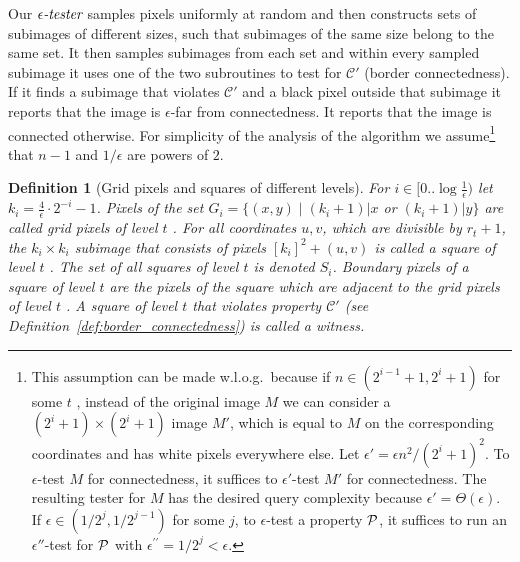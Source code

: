 \documentclass[11pt,english]{article}
\newtheorem{definition}{Definition}[section]
\numberwithin{figure}{section}
\newcommand{\C}{{\mathcal C}}
\newcommand{\eps}{{\epsilon}}
\newcommand{\ste}{{\epsilon\emph{-tester}}}
\newcommand{\integerset}[1]{[0..{#1})}
\newcommand{\lind}{t}
\begin{document}
Our $\ste$ samples pixels uniformly at random and
then constructs sets of subimages of different sizes, such that subimages of the
same size belong to the same set.
It then samples subimages from each set and within every sampled subimage
it uses one of the two subroutines to test for $\C'$ (border
connectedness). If it finds a subimage that violates $\C'$ and a black
pixel outside that subimage it reports that the image is $\eps$-far from
connectedness. It reports that the image is connected otherwise. For simplicity
of the analysis of the algorithm we assume\footnote {This assumption can be made
w.l.o.g.\ because if $n\in(2^{i-1}+1,2^{i}+1)$ for some $\lind$ , instead of the original image $M$ we can consider a $(2^{i}+1)\times (2^{i}+1)$ image $M'$, which is equal to $M$ on the corresponding coordinates and has white pixels everywhere else. Let
$\eps'=\eps n^{2}/(2^{i}+1)^{2}$.
To $\eps$-test $M$ for connectedness, it suffices to $\eps'$-test $M'$ for connectedness.
The resulting tester for $M$ has the desired query complexity because $\eps'=\Theta(\eps)$. If $\eps\in(1/2^{j},1/2^{j-1})$ for
some $j$, to $\eps$-test a property ${\cal P}$, it suffices to run an $\eps''$-test for ${\cal P}$ with  $\eps^{\prime\prime}=1/2^{j}<\eps$.} that $n-1$ and $1/\eps$ are powers of
$2$.

\begin{definition}[Grid pixels and squares of different levels]
\label{def:Grid_pixels_squares_of_different_levels}
For $i\in\integerset{\log\frac{1}{\eps}}$ let $k_{i}=\frac{4}{\eps}\cdot
2^{-i}-1$.
Pixels of the set $G_{i}=\{(x,y)\mid (k_{i}+1)|x$ or $(k_{i}+1)|y\}$ are called
\emph{grid pixels of level $\lind$ .} For all coordinates $u,v$, which are divisible by $r_\lind+1$,
the $k_{i}\times k_{i}$ subimage that consists of pixels $[k_{i}]^{2}+(u,v)$ is
called a \emph{square of level} $\lind$ . The set of all squares of level $\lind$  is denoted $S_{i}$.
{\em Boundary pixels} of a square of level $\lind$  are the pixels of the square which are adjacent to the grid pixels of level $\lind$ . A square of level $\lind$  that violates property $\C'$ (see Definition~\ref{def:border_connectedness}) is called a \emph{witness}.
\end{definition}
\end{document}
